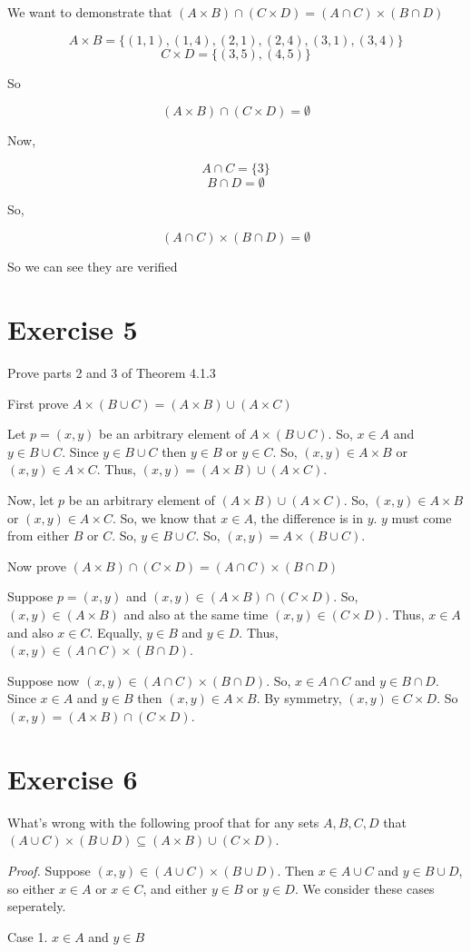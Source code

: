 \documentclass[11pt]{article}
\begin{document}
We want to demonstrate that $(A \times B) \cap (C \times D) = (A \cap C) \times (B \cap D)$

$$A \times B = \{ (1,1), (1,4), (2,1), (2,4), (3,1), (3,4) \}$$
$$C \times D = \{ (3,5), (4,5) \}$$

So 

$$(A \times B) \cap (C \times D) = \emptyset$$

Now,

$$A \cap C = \{3\}$$
$$B \cap D = \emptyset$$

So, 

$$(A \cap C) \times (B \cap D) = \emptyset$$

So we can see they are verified

\section*{Exercise 5}

Prove parts 2 and 3 of Theorem 4.1.3 

First prove $A \times (B \cup C) = (A \times B) \cup (A \times C)$

Let $p = (x,y)$ be an arbitrary element of $A \times (B \cup C)$. So, $x \in A$ 
and $y \in B \cup C$. Since $y \in B \cup C$ then $y \in B$ or $y \in C$. 
So, $(x,y) \in A \times B$ or $(x,y) \in A \times C$. Thus, 
$(x,y)=(A \times B) \cup (A \times C)$.

Now, let $p$ be an arbitrary element of $(A \times B) \cup (A \times C)$. So, 
$(x, y) \in A \times B$ or $(x, y) \in A \times C$. So, we know that $x \in A$,
the difference is in $y$. $y$ must come from either $B$ or $C$. So, 
$y \in B \cup C$. So, $(x,y) = A \times (B \cup C)$.

Now prove $(A \times B) \cap (C \times D) = (A \cap C) \times (B \cap D)$

Suppose $p = (x,y)$ and $(x,y) \in (A \times B) \cap (C \times D)$. 
So, $(x, y) \in (A \times B)$ and also at the same time $(x,y) \in (C \times D)$.
Thus, $x \in A$ and also $x \in C$. Equally, $y \in B$ and $y \in D$. Thus, 
$(x,y) \in (A \cap C) \times (B \cap D)$.

Suppose now $(x,y) \in (A \cap C) \times (B \cap D)$. So, $x \in A \cap C$ and 
$y \in B \cap D$. Since $x \in A$ and $y \in B$ then $(x,y) \in A \times B$. 
By symmetry, $(x,y) \in C \times D$. So $(x,y) = (A \times B) \cap (C \times D)$.

\section*{Exercise 6}

What's wrong with the following proof that for any sets $A, B, C, D$ that 
$(A \cup C) \times (B \cup D) \subseteq (A \times B) \cup (C \times D)$.

\textit{Proof.} Suppose $(x,y) \in (A \cup C) \times (B \cup D)$. Then 
$x \in A \cup C$ and $y \in B \cup D$, so either $x \in A$ or $x \in C$, and 
either $y \in B$ or $y \in D$. We consider these cases seperately.

Case 1. $x \in A$ and $y \in B$
\end{document}
